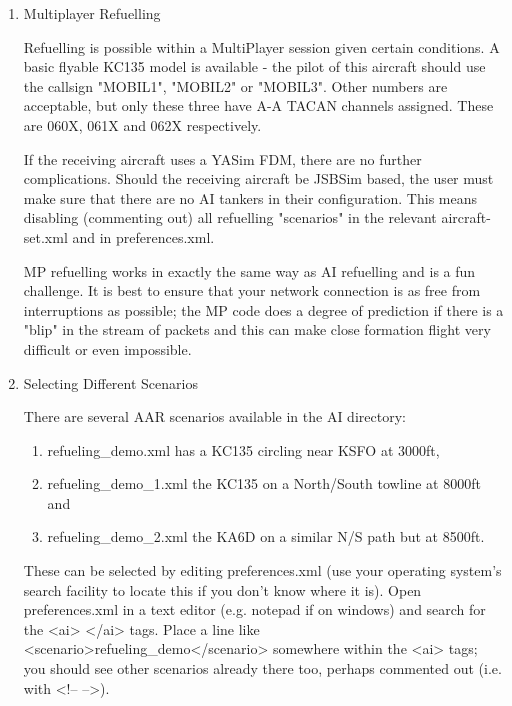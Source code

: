 \begin{enumerate}

\item Multiplayer Refuelling

Refuelling is possible within a MultiPlayer session given certain
conditions.  A basic flyable KC135 model is available - the pilot of
this aircraft should use the callsign "MOBIL1", "MOBIL2" or "MOBIL3". 
Other numbers are acceptable, but only these three have A-A TACAN
channels assigned.  These are 060X, 061X and 062X respectively.

If the receiving aircraft uses a YASim FDM, there are no further
complications.  Should the receiving aircraft be JSBSim based, the user
must make sure that there are no AI tankers in their configuration. 
This means disabling (commenting out) all refuelling "scenarios" in the
relevant aircraft-set.xml and in preferences.xml.

MP refuelling works in exactly the same way as AI refuelling and is a
fun challenge.  It is best to ensure that your network connection is as
free from interruptions as possible; the MP code does a degree of
prediction if there is a "blip" in the stream of packets and this can
make close formation flight very difficult or even impossible.

\item Selecting Different Scenarios

There are several AAR scenarios available in the AI directory:
\begin{enumerate}
\item refueling\_demo.xml has a KC135 circling near KSFO at 3000ft,
\item refueling\_demo\_1.xml the KC135 on a North/South towline at 8000ft and
\item refueling\_demo\_2.xml the KA6D on a similar N/S path but at 8500ft.
\end{enumerate}

These can be selected by editing preferences.xml (use your operating
system's search facility to locate this if you don't know where it is). 
Open preferences.xml in a text editor (e.g. notepad if on windows) and
search for the <ai> </ai> tags.  Place a line like
<scenario>refueling\_demo</scenario> somewhere within the <ai> tags; you
should see other scenarios already there too, perhaps commented out
(i.e. with <!-- -->).

\end{enumerate}

